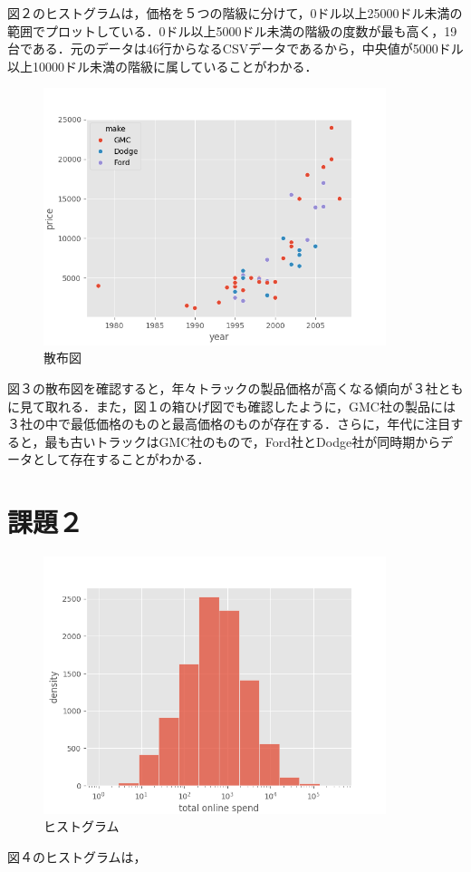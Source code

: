 \documentclass[article]{jlreq}
\begin{document}
図２のヒストグラムは，価格を５つの階級に分けて，0ドル以上25000ドル未満の範囲でプロットしている．0ドル以上5000ドル未満の階級の度数が最も高く，19台である．元のデータは46行からなるCSVデータであるから，中央値が5000ドル以上10000ドル未満の階級に属していることがわかる．

\begin{figure}[H]
  \centering
  \includegraphics[width=100mm]{../plots/hw1/scatterplot.png}
  \caption{散布図}
\end{figure}

図３の散布図を確認すると，年々トラックの製品価格が高くなる傾向が３社ともに見て取れる．また，図１の箱ひげ図でも確認したように，GMC社の製品には３社の中で最低価格のものと最高価格のものが存在する．さらに，年代に注目すると，最も古いトラックはGMC社のもので，Ford社とDodge社が同時期からデータとして存在することがわかる．

\section{課題２}

\begin{figure}[H]
  \centering
  \includegraphics[width=100mm]{../plots/hw1/density.png}
  \caption{ヒストグラム}
\end{figure}

図４のヒストグラムは，


% 
% 

%
% 
\end{document}
